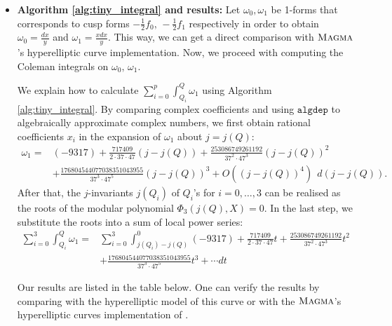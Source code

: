 \begin{itemize}
\item \textbf{Algorithm \ref{alg:tiny_integral} and results:} Let $\omega_0,\omega_1$ be 1-forms that corresponds to cusp forms $-\frac{1}{2}f_0,\,-\frac{1}{2}f_1$ respectively in order to obtain $\omega_0 = \frac{dx}{y}$ and $\omega_1 = \frac{xdx}{y}$. This way, we can get a direct comparison with $\textsc{Magma}{}$'s hyperelliptic curve implementation. Now, we proceed with computing the Coleman integrals on $\omega_0,\,\omega_1$. 




We explain how to calculate $\sum_{i=0}^{p}\int^Q_{Q_i} \omega_1$ using Algorithm \ref{alg:tiny_integral}. By comparing complex coefficients and using $\texttt{algdep}$ to algebraically approximate complex numbers, we first obtain rational coefficients $x_i$ in the expansion of $\omega_1$ about $j=j(Q)$:
\begin{align*} \omega_1  = &(-9317) + \frac{717409}{2 \cdot 37 \cdot 47}(j-j(Q))
                             + \frac{253086749261192}{37^2 \cdot 47^3}(j-j(Q))^2
  \\ &+ \frac{176804544077038351043955}{37^3 \cdot 47^5}(j-j(Q))^3 +
       O((j-j(Q))^4) \ \ d(j-j(Q)). \end{align*}
     After that, the $j$-invariants $j(Q_i)$ of $Q_i$'s for $i = 0,\ldots,3$ can be realised as the roots of the modular polynomial $\Phi_3(j(Q),X) =0 $. In the last step, we substitute the roots into a sum of local power series: 
\begin{align*}
    \sum_{i=0}^3 \int_{Q_i}^Q \omega_1 = &\sum_{i=0}^3 \int_{j(Q_i)-j(Q)}^{0} (-9317) + \frac{717409}{2 \cdot 37 \cdot 47}t + \frac{253086749261192}{37^2 \cdot 47^3}t^2 \\&+ \frac{176804544077038351043955}{37^3 \cdot 47^5}t^3 +  \cdots  dt 
\end{align*}


Our results are listed in the table below. One can verify the results by comparing with the hyperelliptic model of this curve or with the $\textsc{Magma}{}$'s hyperelliptic curves implementation of \cite{balatuit}.
\end{itemize}

